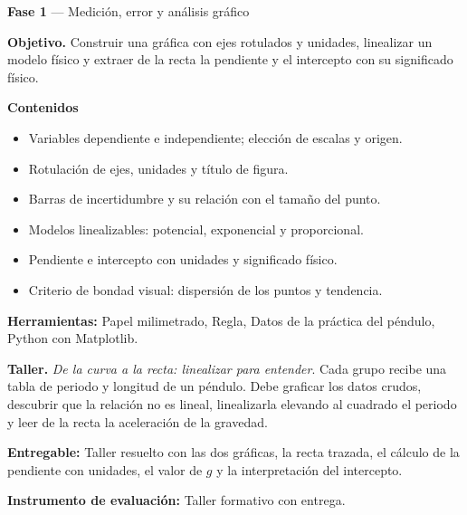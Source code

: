 \documentclass[11pt,a4paper]{article}
\begin{document}
\begin{tcolorbox}[cajaContenido,title={Semana 3 --- Graficación, linealización y lectura de una recta}]
\textbf{Fase 1} --- Medición, error y análisis gráfico

\textbf{Objetivo.} Construir una gráfica con ejes rotulados y unidades, linealizar un modelo físico y extraer de la recta la pendiente y el intercepto con su significado físico.

\textbf{Contenidos}

\begin{itemize}[leftmargin=1.4em,itemsep=2pt,topsep=3pt]
  \item Variables dependiente e independiente; elección de escalas y origen.
  \item Rotulación de ejes, unidades y título de figura.
  \item Barras de incertidumbre y su relación con el tamaño del punto.
  \item Modelos linealizables: potencial, exponencial y proporcional.
  \item Pendiente e intercepto con unidades y significado físico.
  \item Criterio de bondad visual: dispersión de los puntos y tendencia.
\end{itemize}

\textbf{Herramientas:} Papel milimetrado, Regla, Datos de la práctica del péndulo, Python con Matplotlib.

\textbf{Taller.} \emph{De la curva a la recta: linealizar para entender}. Cada grupo recibe una tabla de periodo y longitud de un péndulo. Debe graficar los datos crudos, descubrir que la relación no es lineal, linealizarla elevando al cuadrado el periodo y leer de la recta la aceleración de la gravedad.

\textbf{Entregable:} Taller resuelto con las dos gráficas, la recta trazada, el cálculo de la pendiente con unidades, el valor de $g$ y la interpretación del intercepto.

\textbf{Instrumento de evaluación:} Taller formativo con entrega.
\end{tcolorbox}
\end{document}

